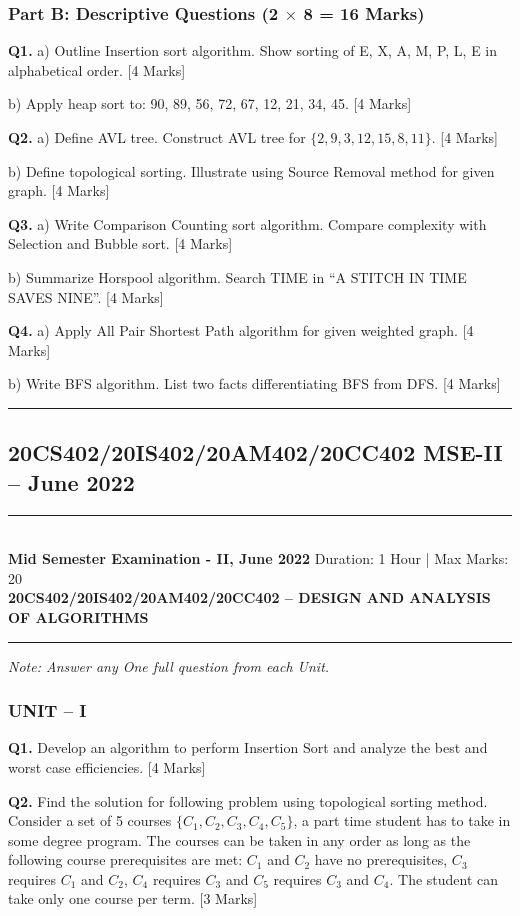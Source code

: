 \documentclass[11pt,a4paper]{article}
\newcommand{\examheader}[4]{
\noindent\rule{\textwidth}{0.5pt}\\
\textbf{#1} \hfill Duration: #3 | Max Marks: #4\\
\textbf{#2}\\
\rule{\textwidth}{0.5pt}
\vspace{0.2cm}
}
\begin{document}
\subsubsection*{Part B: Descriptive Questions (2 $\times$ 8 = 16 Marks)}

\textbf{Q1.} a) Outline Insertion sort algorithm. Show sorting of E, X, A, M, P, L, E in alphabetical order. \hfill [4 Marks]

b) Apply heap sort to: 90, 89, 56, 72, 67, 12, 21, 34, 45. \hfill [4 Marks]

\textbf{Q2.} a) Define AVL tree. Construct AVL tree for $\{2, 9, 3, 12, 15, 8, 11\}$. \hfill [4 Marks]

b) Define topological sorting. Illustrate using Source Removal method for given graph. \hfill [4 Marks]

\textbf{Q3.} a) Write Comparison Counting sort algorithm. Compare complexity with Selection and Bubble sort. \hfill [4 Marks]

b) Summarize Horspool algorithm. Search TIME in ``A STITCH IN TIME SAVES NINE''. \hfill [4 Marks]

\textbf{Q4.} a) Apply All Pair Shortest Path algorithm for given weighted graph. \hfill [4 Marks]

b) Write BFS algorithm. List two facts differentiating BFS from DFS. \hfill [4 Marks]

\vspace{0.5cm}
\hrule
\vspace{0.5cm}

\subsection{20CS402/20IS402/20AM402/20CC402 MSE-II -- June 2022}
\examheader{Mid Semester Examination - II, June 2022}{20CS402/20IS402/20AM402/20CC402 -- DESIGN AND ANALYSIS OF ALGORITHMS}{1 Hour}{20}

\textit{Note: Answer any One full question from each Unit.}

\subsubsection*{UNIT -- I}

\textbf{Q1.} Develop an algorithm to perform Insertion Sort and analyze the best and worst case efficiencies. \hfill [4 Marks]

\textbf{Q2.} Find the solution for following problem using topological sorting method. Consider a set of 5 courses $\{C_1, C_2, C_3, C_4, C_5\}$, a part time student has to take in some degree program. The courses can be taken in any order as long as the following course prerequisites are met: $C_1$ and $C_2$ have no prerequisites, $C_3$ requires $C_1$ and $C_2$, $C_4$ requires $C_3$ and $C_5$ requires $C_3$ and $C_4$. The student can take only one course per term. \hfill [3 Marks]
\end{document}
